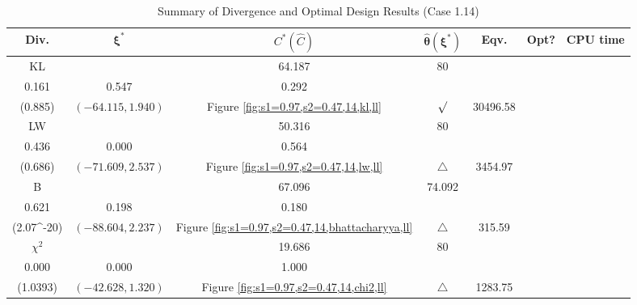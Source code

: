 \documentclass[12pt, a4paper]{article}
\begin{document}
\begin{table}[H]
\centering
\renewcommand{\arraystretch}{1.5} %
\setlength{\tabcolsep}{8pt} %
\begin{tabular}{|c|c|c|c|c|c|c|}
\hline
\textbf{Div.} & \(\boldsymbol{\xi^*}\) & \(C^* (\hat{C})\) & \(\boldsymbol{\hat{\theta}(\xi^*)}\) & \textbf{Eqv.} & \textbf{Opt?} & \textbf{CPU time} \\
\hline
KL & \(\left\{\begin{array}{ccc}
47.75 & 64.187 & 80 \\
0.161 & 0.547 & 0.292
\end{array}\right\}\) &
\(\begin{array}{c}
0.885 \\
(0.885)
\end{array}\) & 
\((-64.115, 1.940)\) & 
Figure \ref{fig:s1=0.97,s2=0.47,14,kl,ll} & $\surd$ & 30496.58 \\
\hline
LW & \(\left\{\begin{array}{ccc}
45.006 & 50.316 & 80 \\
0.436 & 0.000 & 0.564
\end{array}\right\}\) &
\(\begin{array}{c}
0.0858 \\
(0.686)
\end{array}\) & 
\((-71.609, 2.537)\) & 
Figure \ref{fig:s1=0.97,s2=0.47,14,lw,ll} & $\triangle$ & 3454.97 \\
\hline
B & \(\left\{\begin{array}{ccc}
29.672 & 67.096 & 74.092 \\
0.621 & 0.198 & 0.180
\end{array}\right\}\) &
\(\begin{array}{c}
0 \\
(2.07\times 10^{-20})
\end{array}\) & 
\((-88.604, 2.237)\) & 
Figure \ref{fig:s1=0.97,s2=0.47,14,bhattacharyya,ll} & $\triangle$ & 315.59 \\
\hline
\(\chi^2\) & \(\left\{\begin{array}{ccc}
14.673 & 19.686 & 80 \\
0.000 & 0.000 & 1.000
\end{array}\right\}\) &
\(\begin{array}{c}
4.938\times 10^{11} \\
(1.0393)
\end{array}\) & 
\((-42.628, 1.320)\) & 
Figure \ref{fig:s1=0.97,s2=0.47,14,chi2,ll} & $\triangle$ & 1283.75 \\
\hline
\end{tabular}
\caption{Summary of Divergence and Optimal Design Results (Case 1.14)}
\label{tab:results1.14}
\end{table}
\end{document}
